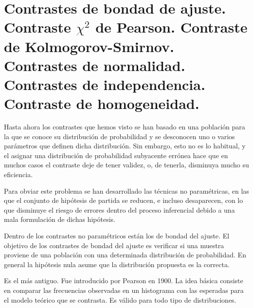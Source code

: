 \chapter[Contrastes de bondad de ajuste.]{Contrastes de bondad de ajuste. \\
\normalsize Contraste $\chi^2$ de Pearson. Contraste de Kolmogorov-Smirnov. Contrastes de normalidad. Contrastes de independencia. Contraste de homogeneidad.}

Hasta ahora los contrastes que hemos visto se han basado en una poblaci\'on para la que se conoce su distribuci\'on de probabilidad y se desconocen uno o varios par\'ametros que definen dicha distribuci\'on. Sin embargo, esto no es lo habitual, y el asignar una distribuci\'on de probabilidad subyacente err\'onea hace que en muchos casos el contraste deje de tener validez, o, de tenerla, disminuya mucho su eficiencia.

Para obviar este problema se han desarrollado las t\'ecnicas no param\'etricas, en las que el conjunto de hip\'otesis de partida se reducen, e incluso desaparecen, con lo que disminuye el riesgo de errores dentro del proceso inferencial debido a una mala formulaci\'on de dichas hip\'otesis.

Dentro de los contrastes no param\'etricos est\'an los de bondad del ajuste. El objetivo de los contrastes de bondad del ajuste es verificar si una muestra proviene de una poblaci\'on con una determinada distribuci\'on de probabilidad. En general la hip\'otesis nula asume que la distribuci\'on propuesta es la correcta. 



Es el m\'as antiguo. Fue introducido por Pearson en 1900. La idea b\'asica consiste en comparar las frecuencias observadas en un histograma con las esperadas para el modelo te\'orico que se contrasta. Es v\'alido para todo tipo de distribuciones.